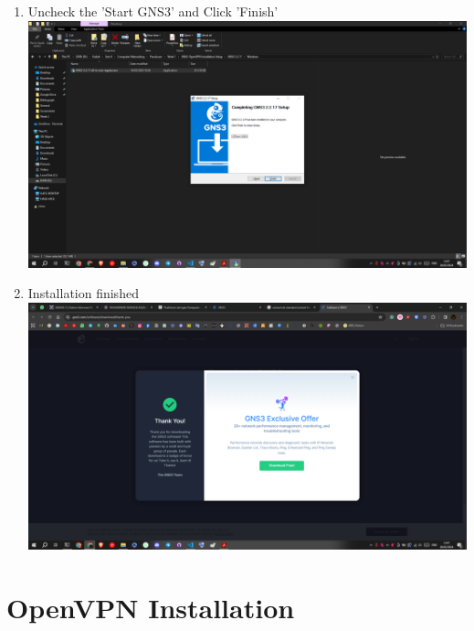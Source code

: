 \documentclass[12pt,titlepage]{article}
\begin{document}
\begin{enumerate}
    \item Uncheck the 'Start GNS3' and Click 'Finish' \\ \includegraphics[width=.9\textwidth]{images/figures/Screenshot (441).png}
    \item Installation finished \\ \includegraphics[width=.9\textwidth]{images/figures/Screenshot (442).png}
\end{enumerate}

\newpage

\section{OpenVPN Installation}
\end{document}
